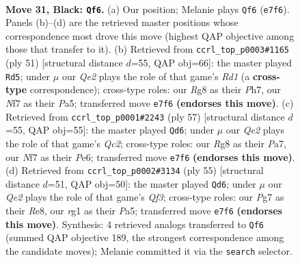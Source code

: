 \documentclass[11pt]{article}
\begin{document}
\clearpage

\begin{figure}[p]\centering
\begin{subfigure}{0.46\textwidth}\centering
\resizebox{\linewidth}{!}{%
\newchessgame
\chessboard[
  setfen={6r1/p1pkqnpp/1p2p3/2p5/5PP1/2P1Q2P/1P6/2K3R1 b - - 2 31},
  showmover=false,
  pgfstyle=straightmove, color=movearrow, markmove={e7-f6}
]}
\caption{}
\end{subfigure}\hfill
\begin{subfigure}{0.46\textwidth}\centering
\resizebox{\linewidth}{!}{%
\newchessgame
\chessboard[
  setfen={3r2k1/2q1pp1p/2p3p1/p7/P1Q2PP1/1P6/2P4P/2K1R3 b - - 2 26},
  showmover=false,
  pgfstyle=straightmove, color=movearrow, markmove={d8-d5}
]}
\caption{}
\end{subfigure}
\\[4pt]
\begin{subfigure}{0.46\textwidth}\centering
\resizebox{\linewidth}{!}{%
\newchessgame
\chessboard[
  setfen={6k1/p1q2p1p/2p1p1p1/5r2/8/1PQ2PP1/P1P4P/2K1R3 b - - 0 29},
  showmover=false,
  pgfstyle=straightmove, color=movearrow, markmove={c7-d6}
]}
\caption{}
\end{subfigure}\hfill
\begin{subfigure}{0.46\textwidth}\centering
\resizebox{\linewidth}{!}{%
\newchessgame
\chessboard[
  setfen={4r3/2p2pk1/1p3qp1/p2Pp3/2P1Q3/1P4P1/P4PK1/3R4 b - - 0 28},
  showmover=false,
  pgfstyle=straightmove, color=movearrow, markmove={f6-d6}
]}
\caption{}
\end{subfigure}
\caption{\textbf{Move 31, Black: \texttt{Qf6}.} (a) Our position; Melanie plays \texttt{Qf6} (\texttt{e7f6}). Panels (b)--(d) are the retrieved master positions whose correspondence most drove this move (highest QAP objective among those that transfer to it). (b) Retrieved from \texttt{ccrl\_top\_p0003\#1165} (ply 51) [structural distance $d$=55, QAP obj=66]: the master played \texttt{Rd5}; under $\mu$ our \emph{Qe2} plays the role of that game's \emph{Rd1} (a \textbf{cross-type} correspondence); cross-type roles: our \emph{R}g8 as their \emph{P}h7, our \emph{N}f7 as their \emph{P}a5; transferred move \texttt{e7f6} \textbf{(endorses this move)}. (c) Retrieved from \texttt{ccrl\_top\_p0001\#2243} (ply 57) [structural distance $d$=55, QAP obj=55]: the master played \texttt{Qd6}; under $\mu$ our \emph{Qe2} plays the role of that game's \emph{Qc2}; cross-type roles: our \emph{R}g8 as their \emph{P}a7, our \emph{N}f7 as their \emph{P}e6; transferred move \texttt{e7f6} \textbf{(endorses this move)}. (d) Retrieved from \texttt{ccrl\_top\_p0002\#3134} (ply 55) [structural distance $d$=51, QAP obj=50]: the master played \texttt{Qd6}; under $\mu$ our \emph{Qe2} plays the role of that game's \emph{Qf3}; cross-type roles: our \emph{P}g7 as their \emph{R}e8, our \emph{r}g1 as their \emph{P}a5; transferred move \texttt{e7f6} \textbf{(endorses this move)}. Synthesis: 4 retrieved analogs transferred to \texttt{Qf6} (summed QAP objective 189, the strongest correspondence among the candidate moves); Melanie committed it via the \texttt{search} selector.}
\label{fig:thought-m61}
\end{figure}
\end{document}
